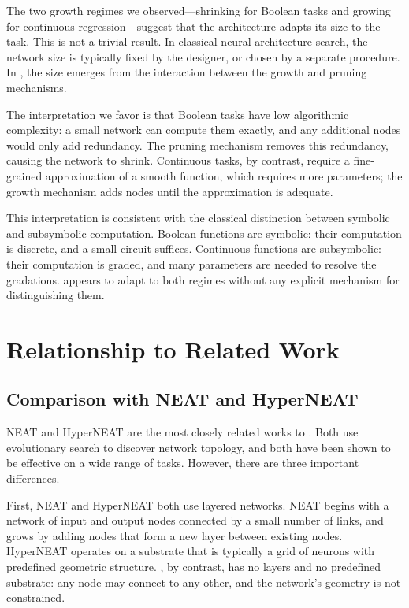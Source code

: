 The two growth regimes we observed---shrinking for Boolean tasks and
growing for continuous regression---suggest that the architecture
adapts its size to the task. This is not a trivial result. In
classical neural architecture search, the network size is typically
fixed by the designer, or chosen by a separate procedure. In
\modnet{}, the size emerges from the interaction between the growth
and pruning mechanisms.

The interpretation we favor is that Boolean tasks have low
algorithmic complexity: a small network can compute them exactly, and
any additional nodes would only add redundancy. The pruning mechanism
removes this redundancy, causing the network to shrink. Continuous
tasks, by contrast, require a fine-grained approximation of a smooth
function, which requires more parameters; the growth mechanism adds
nodes until the approximation is adequate.

This interpretation is consistent with the classical distinction
between symbolic and subsymbolic computation. Boolean functions are
symbolic: their computation is discrete, and a small circuit suffices.
Continuous functions are subsymbolic: their computation is graded,
and many parameters are needed to resolve the gradations. \modnet{}
appears to adapt to both regimes without any explicit mechanism for
distinguishing them.

\section{Relationship to Related Work}
\label{sec:relation-related}

\subsection{Comparison with NEAT and HyperNEAT}
\label{sec:relation-neat}

NEAT \citep{stanley2002evolving} and HyperNEAT
\citep{stanley2009hypercube} are the most closely related works to
\modnet{}. Both use evolutionary search to discover network topology,
and both have been shown to be effective on a wide range of tasks.
However, there are three important differences.

First, NEAT and HyperNEAT both use layered networks. NEAT begins with
a network of input and output nodes connected by a small number of
links, and grows by adding nodes that form a new layer between
existing nodes. HyperNEAT operates on a substrate that is typically a
grid of neurons with predefined geometric structure. \modnet{}, by
contrast, has no layers and no predefined substrate: any node may
connect to any other, and the network's geometry is not constrained.


